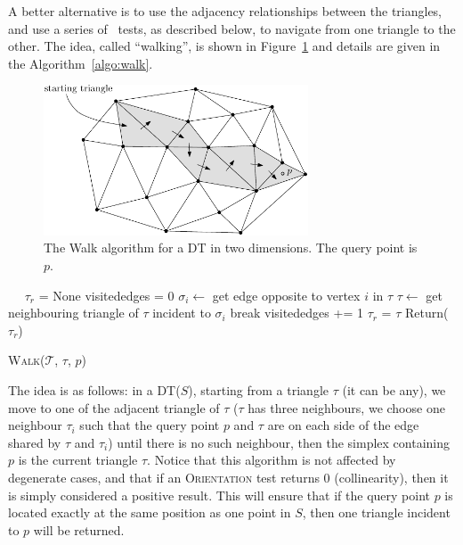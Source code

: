 A better alternative is to use the adjacency relationships between the triangles, and use a series of \Orient\ tests, as described below, to navigate from one triangle to the other. 
The idea, called ``walking'', is shown in Figure~\ref{fig:walk} and details are given in the Algorithm~\ref{algo:walk}.
\begin{figure}
  \centering
  \includegraphics[width=0.7\textwidth]{figs/walk}
  \caption{The Walk algorithm for a DT in two dimensions. The query point is $p$.}%
\label{fig:walk}
\end{figure}
\begin{algorithm}[t]
  \DontPrintSemicolon\
  \KwOut{$\tau_r$: the triangle in $\mathcal{T}$ containing $p$}
  \BlankLine\ 
  $\tau_r$ = None\;
  {
    visitededges = 0\;
    {
      $\sigma_i \leftarrow$ get edge opposite to vertex $i$ in $\tau$\;
      {
        $\tau \leftarrow$ get neighbouring triangle of $\tau$ incident to $\sigma_i$\;
        break\;
      }
      visitededges += 1\;
    }  
    {
      $\tau_r$ = $\tau$\;
    }
  }
  Return($\tau_r$)
  \caption{W\textsc{alk}($\mathcal{T}$, $\tau$, $p$)}%
\label{algo:walk}
\end{algorithm}
The idea is as follows: in a DT($S$), starting from a triangle $\tau$ (it can be any), we move to one of the adjacent triangle of $\tau$ ($\tau$ has three neighbours, we choose one neighbour $\tau_i$ such that the query point $p$ and $\tau$ are on each side of the edge shared by $\tau$ and $\tau_i$) until there is no such neighbour, then the simplex containing $p$ is the current triangle $\tau$.
Notice that this algorithm is not affected by degenerate cases, and that if an \textrm{O}\textsc{rientation} test returns 0 (collinearity), then it is simply considered a positive result. 
This will ensure that if the query point $p$ is located exactly at the same position as one point in $S$, then one triangle incident to $p$ will be returned.


